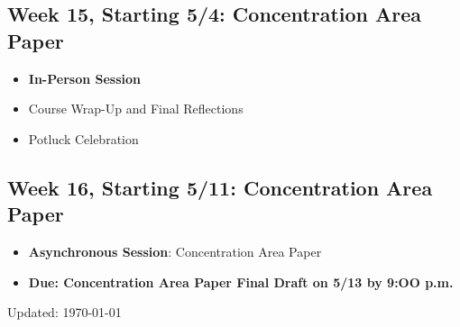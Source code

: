\documentclass[11pt, letterpaper]{article}
\begin{document}
\subsection*{Week 15, Starting 5/4: Concentration Area Paper}
\begin{itemize}
    \item \textbf{In-Person Session}
    \item Course Wrap-Up and Final Reflections
    \item Potluck Celebration
\end{itemize}

\subsection*{Week 16, Starting 5/11: Concentration Area Paper}
\begin{itemize}
    \item \textbf{Asynchronous Session}: Concentration Area Paper
    \item \textbf{Due: Concentration Area Paper Final Draft on 5/13 by 9:OO p.m.}
\end{itemize}

            \singlespace
            
            

\begin{flushright}
Updated: \today
\end{flushright}

            
\end{document}
